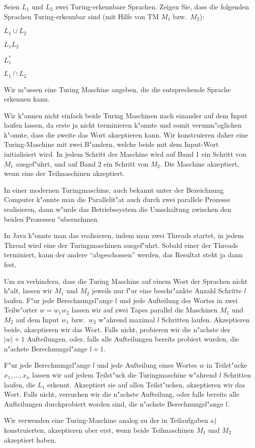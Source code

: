 Seien $L_1$ und $L_2$ zwei Turing-erkennbare Sprachen. Zeigen Sie, dass
die folgenden Sprachen Turing-erkennbar sind (mit Hilfe von TM $M_1$
bzw.~$M_2$):
\begin{teilaufgaben}
\item $L_1\cup L_2$
\item $L_1L_2$
\item $L_1^*$
\item $L_1\cap L_2$
\end{teilaufgaben}

\begin{loesung}
Wir m"ussen eine Turing Maschine angeben, die die entsprechende
Sprache erkennen kann.
\begin{teilaufgaben}
\item Wir k"onnen nicht einfach beide Turing Maschinen nach einander
auf dem Input laufen lassen, da erste ja nicht terminieren k"onnte und
somit verunm"oglichen k"onnte, dass die zweite das Wort akzeptieren kann.
Wir konstruieren daher eine Turing-Maschine mit zwei B"andern, welche
beide mit dem Input-Wort initialisiert wird. In jedem Schritt der
Maschine wird auf Band 1 ein Schritt von $M_1$ ausgef"uhrt,
und auf Band 2 ein Schritt von $M_2$.
Die Maschine akzeptiert, wenn eine der Teilmaschinen
akzeptiert.

In einer modernen Turingmaschine, auch bekannt unter der Bezeichnung
Computer k"onnte man die Parallelit"at auch durch zwei parallele
Prozesse realisieren, dann w"urde das Betriebssystem die Umschaltung
zwischen den beiden Prozessen "ubernehmen.

In Java k"onnte man das realisieren, indem man zwei Threads startet,
in jedem Thread wird eine der Turingmaschinen ausgef"uhrt. Sobald
einer der Threads terminiert, kann der andere ``abgeschossen'' werden,
das Resultat steht ja dann fest.
\item
Um zu verhindern, dass die Turing Maschine auf einem Wort der
Sprachen nicht h"alt, lassen wir $M_1$ und $M_2$ jeweils nur f"ur eine
beschr"ankte Anzahl Schritte $l$ laufen.
F"ur jede Berechnungsl"ange $l$ und jede Aufteilung des Wortes in zwei
Teilw"orter $w=w_1w_2$ lassen wir auf zwei Tapes parallel die
Maschinen $M_1$ und $M_2$ auf dem Input $w_1$ bzw.~$w_2$ w"ahrend
maximal $l$ Schritten laufen. Akzeptieren beide, akzeptieren wir das
Wort. Falls nicht, probieren wir die n"achste der $|w|+1$ Aufteilungen,
oder, falls alle Aufteilungen bereits probiert wurden, die n"achste
Berechnungsl"ange $l+1$.
\item
F"ur jede Berechnungsl"ange $l$ und
jede Aufteilung eines Wortes $w$ in Teilst"ucke $x_1,\dots,x_n$
lassen
wir auf jedem Teilst"uck die Turingmaschine w"ahrend $l$ Schritten
laufen, die
$L_1$ erkennt. Akzeptiert sie auf allen Teilst"ucken, akzeptieren wir
das Wort. Falls nicht, versuchen wir die n"achste Aufteilung, oder falls
bereits alle Aufteilungen durchprobiert worden sind, die n"achste Berechnungsl"ange $l$.
\item Wir verwenden eine Turing-Maschine analog zu der in Teilaufgaben a)
konstruierten, akzeptieren aber erst, wenn beide Teilmaschinen
$M_1$ und $M_2$ akzeptiert haben.
\end{teilaufgaben}
\end{loesung}
